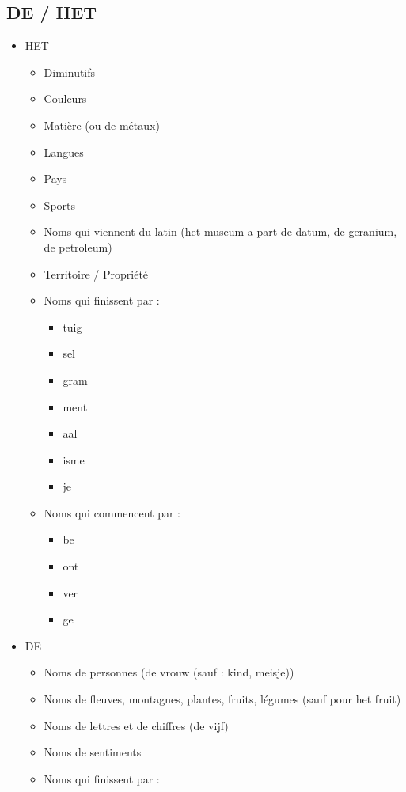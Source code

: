 \documentclass[a4paper]{article}
\begin{document}
\subsection{DE / HET}
\begin{itemize}[label=\textbullet, font=\Large]
  \item HET
  \begin{itemize}[label=, font=\scriptsize]
    \item Diminutifs
    \item Couleurs
    \item Matière (ou de métaux)
    \item Langues
    \item Pays
    \item Sports
    \item Noms qui viennent du latin (het museum a part de datum, de geranium, de petroleum)
    \item Territoire / Propriété
    \item Noms qui finissent par :
    \begin{itemize}
      \item tuig
      \item sel
      \item gram 
      \item ment 
      \item aal 
      \item isme 
      \item je
    \end{itemize}
    \item Noms qui commencent par :
    \begin{itemize}
      \item be
      \item ont
      \item ver 
      \item ge
    \end{itemize}
  \end{itemize}
  \item DE
  \begin{itemize}[label=, font=\scriptsize]
    \item Noms de personnes (de vrouw (sauf : kind, meisje))
    \item Noms de fleuves, montagnes, plantes, fruits, légumes (sauf pour het fruit)
    \item Noms de lettres et de chiffres (de vijf)
    \item Noms de sentiments
    \item Noms qui finissent par :

\end{itemize}
\end{itemize}
\end{document}
